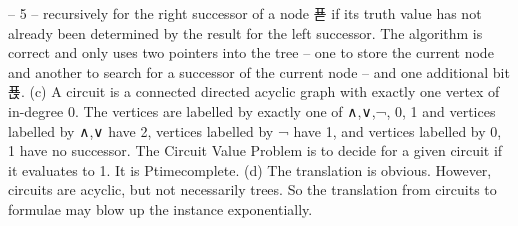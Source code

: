 {– 5 –
recursively for the right successor of a node 푣 if its truth value has not already been
determined by the result for the left successor.
The algorithm is correct and only uses two pointers into the tree – one to store the current
node and another to search for a successor of the current node – and one additional bit 푡.
(c) A circuit is a connected directed acyclic graph with exactly one vertex of in-degree 0.
The vertices are labelled by exactly one of ∧,∨,¬, 0, 1 and vertices labelled by ∧,∨ have
2, vertices labelled by ¬ have 1, and vertices labelled by 0, 1 have no successor.
The Circuit Value Problem is to decide for a given circuit if it evaluates to 1. It is Ptimecomplete.
(d) The translation is obvious. However, circuits are acyclic, but not necessarily trees. So the
translation from circuits to formulae may blow up the instance exponentially.


\\






}